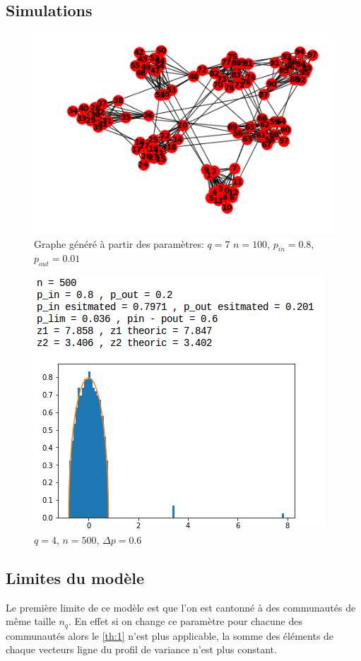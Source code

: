 \subsection{Simulations}
\begin{figure}[H]
\centering
\includegraphics[scale=0.6]{static/graph_q7_n100_pin08_pout0011.png}
\caption{Graphe généré à partir des paramètres: $q=7$ $n=100$, $p_{in}=0.8$, $p_{out}=0.01$}
\end{figure}
\begin{figure}[H]
\centering
\includegraphics[scale=0.6]{static/spectral_q4_n500_pin08_pout02}
\caption{$q=4$, $n=500$, $\Delta p=0.6$}
\label{n500delta-05}
\end{figure}
\subsection{Limites du modèle}
Le première limite de ce modèle est que l'on est cantonné à des communautés de même taille $n_q$.
En effet si on change ce paramètre pour chacune des communautés alors le \autoref{th:1} n'est plus applicable, la somme des éléments de chaque vecteurs ligne du profil de variance n'est plus constant.\\

